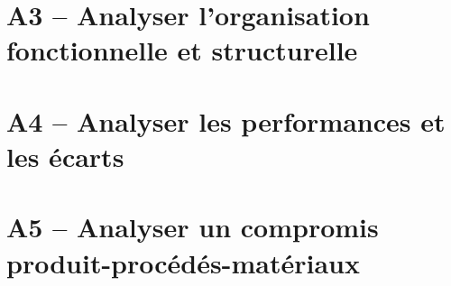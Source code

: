 \section{A3 -- Analyser l'organisation fonctionnelle et structurelle}

\section{A4 -- Analyser les performances et les écarts}

\section{A5 -- Analyser un compromis produit-procédés-matériaux}



\proffalse
\begin{multicols}{2}
%
%
%
%
%
%

\end{multicols}

%
%
%
%
%
%

